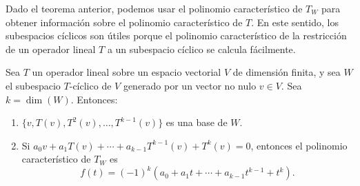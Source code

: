 \documentclass[12pt,a4paper]{book}
\begin{document}
    Dado el teorema anterior, podemos usar el polinomio característico de $T_W$ para obtener información sobre el polinomio característico de $T$. En este sentido, los subespacios cíclicos son útiles porque el polinomio característico de la restricción de un operador lineal $T$ a un subespacio cíclico se calcula fácilmente.

    \begin{teorema}
        Sea $T$ un operador lineal sobre un espacio vectorial $V$ de dimensión finita, y sea $W$ el subespacio $T$-cíclico de $V$ generado por un vector no nulo $v\in V$. Sea $k=\dim(W)$. Entonces:
        \begin{enumerate}[label=(\alph*)]
            \item $\{v,T(v),T^2(v),\dots,T^{k-1}(v)\}$ es una base de $W$.
            \item Si $a_0v+a_1T(v)+\cdots+a_{k-1}T^{k-1}(v)+T^k(v)=0$, entonces el polinomio característico de $T_W$ es
            \begin{equation*}
                f(t)=(-1)^k\left(a_0+a_1t+\cdots+a_{k-1}t^{k-1}+t^k\right).
            \end{equation*}
        \end{enumerate}
    \end{teorema}
\end{document}
